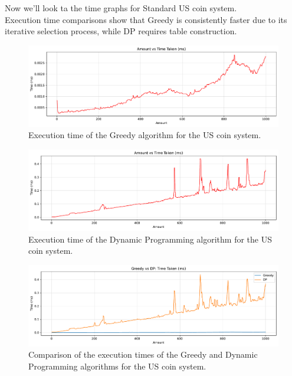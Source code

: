 \documentclass[12pt,a4paper]{report}
\begin{document}
Now we'll look ta the time graphs for Standard US coin system. \\
Execution time comparisons show that Greedy is consistently faster due to its iterative selection process, while DP requires table construction.

\begin{figure}[H]
  \centering
  \includegraphics[width=\textwidth]{graphs/greedy_time_standard_plot.pdf}
  \caption{Execution time of the Greedy algorithm for the US coin system.}
  \label{fig:greedy_time_standard}
\end{figure}

\begin{figure}[H]
  \centering
  \includegraphics[width=\textwidth]{graphs/dp_time_standard_plot.pdf}
  \caption{Execution time of the Dynamic Programming algorithm for the US coin system.}
  \label{fig:dp_time_standard}
\end{figure}

\begin{figure}[H]
  \centering
  \includegraphics[width=\textwidth]{graphs/compare_time_standard_plot.pdf}
  \caption{Comparison of the execution times of the Greedy and Dynamic Programming algorithms for the US coin system.}
  \label{fig:compare_time_standard_plot}
\end{figure}
\end{document}
